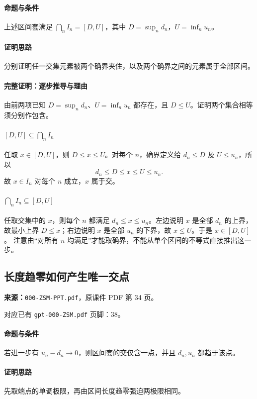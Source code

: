 \paragraph{命题与条件}上述区间套满足 $\bigcap_n I_n=[D,U]$，其中 $D=\sup_n d_n$，$U=\inf_n u_n$。
\paragraph{证明思路}分别证明任一交集元素被两个确界夹住，以及两个确界之间的元素属于全部区间。
\paragraph{完整证明：逐步推导与理由}

由前两项已知 $D=\sup_n d_n$、$U=\inf_n u_n$ 都存在，且 $D\le U$。证明两个集合相等须分别作包含。
\paragraph{$[D,U]\subseteq\bigcap_n I_n$}任取 $x\in[D,U]$，则 $D\le x\le U$。对每个 $n$，确界定义给 $d_n\le D$ 及 $U\le u_n$，所以
\[d_n\le D\le x\le U\le u_n.\]
故 $x\in I_n$ 对每个 $n$ 成立，$x$ 属于交。
\paragraph{$\bigcap_n I_n\subseteq[D,U]$}任取交集中的 $x$，则每个 $n$ 都满足 $d_n\le x\le u_n$。左边说明 $x$ 是全部 $d_n$ 的上界，故最小上界 $D\le x$；右边说明 $x$ 是全部 $u_n$ 的下界，故 $x\le U$。于是 $x\in[D,U]$。
注意由“对所有 $n$ 均满足”才能取确界，不能从单个区间的不等式直接推出这一步。

\clearpage\subsection{长度趋零如何产生唯一交点}
\textbf{来源：}\texttt{000-ZSM-PPT.pdf}，原课件 PDF 第 34 页。\par
对应已有 \texttt{gpt-000-ZSM.pdf} 页脚：38。\par
\paragraph{命题与条件}若进一步有 $u_n-d_n\to0$，则区间套的交仅含一点，并且 $d_n,u_n$ 都趋于该点。
\paragraph{证明思路}先取端点的单调极限，再由区间长度趋零强迫两极限相同。
